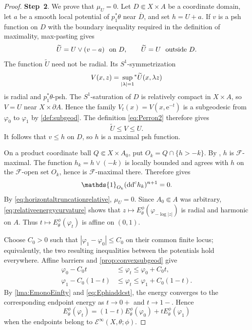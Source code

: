 \begin{proof}
    \textbf{Step~2}. We prove that $\mu_U=0$. Let $D\Subset X\times A$ be a coordinate domain, let $a$ be a smooth local potential of $p_1^*\theta$ near $\overline D$, and set $h=U+a$. If $v$ is a psh function on $D$ with the boundary inequality required in the definition of maximality, max-pasting gives
    \[
        \widetilde U=U\lor(v-a)\ \textup{ on }D,
        \qquad \widetilde U=U\ \textup{ outside }D.
    \]
    The function $\widetilde U$ need not be radial. Its $S^1$-symmetrization
    \[
        V(x,z)=\uscsup[|\lambda|=1]\widetilde U(x,\lambda z)
    \]
    is radial and $p_1^*\theta$-psh. The $S^1$-saturation of $D$ is relatively compact in $X\times A$, so $V=U$ near $X\times\partial A$. Hence the family $V_t(x)=V(x,\mathrm{e}^{-t})$ is a subgeodesic from $\varphi_0$ to $\varphi_1$ by \cref{def:subgeod}. The definition \eqref{eq:Perron2} therefore gives
    \[
        \widetilde U\leq V\leq U.
    \]
    It follows that $v\leq h$ on $D$, so $h$ is a maximal psh function.

    On a product coordinate ball $Q\Subset X\times A_0$, put $O_k=Q\cap\{h>-k\}$. By \cite[Proposition~5.9.3]{EKF}, $h$ is $\mathcal F$-maximal. The function $h_k=h\lor(-k)$ is locally bounded and agrees with $h$ on the $\mathcal F$-open set $O_k$, hence is $\mathcal F$-maximal there. Therefore \cite[Theorem~5.10.1]{EKF} gives
    \[
        \mathds{1}_{O_k}(\ddc h_k)^{n+1}=0.
    \]
    By \eqref{eq:horizontaltruncationrelative}, $\mu_U=0$. Since $A_0\Subset A$ was arbitrary, \eqref{eq:relativeenergycurvature} shows that $z\mapsto E_\theta^\phi(\varphi_{-\log|z|})$ is radial and harmonic on $A$. Thus $t\mapsto E_\theta^\phi(\varphi_t)$ is affine on $(0,1)$.

    Choose $C_0>0$ such that $|\varphi_1-\varphi_0|\leq C_0$ on their common finite locus; equivalently, the two resulting inequalities between the potentials hold everywhere. Affine barriers and \cref{prop:convexsubgeod} give
    \[
        \begin{aligned}
        \varphi_0-C_0t&\leq\varphi_t\leq\varphi_0+C_0t,\\
        \varphi_1-C_0(1-t)&\leq\varphi_t\leq\varphi_1+C_0(1-t).
        \end{aligned}
    \]
    By \cref{lma:EmonoEinfty} and \eqref{eq:Ephiaddcst}, the energy converges to the corresponding endpoint energy as $t\to0+$ and $t\to1-$. Hence
    \begin{equation}\label{eq:relativeenergylinearbounded}
        E_\theta^\phi(\varphi_t)
        =(1-t)E_\theta^\phi(\varphi_0)+tE_\theta^\phi(\varphi_1)
    \end{equation}
    when the endpoints belong to $\mathcal E^\infty(X,\theta;\phi)$.


\end{proof}
